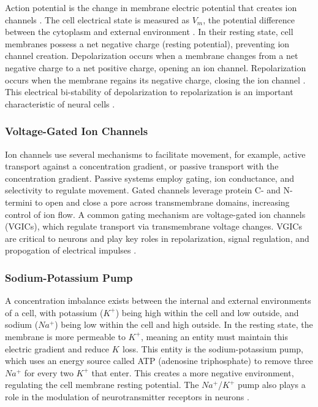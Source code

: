 \documentclass{article} %
\begin{document}
\begin{multicols}{2}
Action potential is the change in membrane electric potential that creates ion channels \cite{rubaiy2017electrophysiology}. The cell electrical state is measured as $V_{m}$, the potential difference between the cytoplasm and external environment \cite{cervera2016bioelectrical}. In their resting state, cell membranes possess a net negative charge (resting potential), preventing ion channel creation. Depolarization occurs when a membrane changes from a net negative charge to a net positive charge, opening an ion channel. Repolarization occurs when the membrane regains its negative charge, closing the ion channel \cite{rubaiy2017electrophysiology}. This electrical bi-stability of depolarization to repolarization is an important characteristic of neural cells \cite{cervera2016bioelectrical}.

\subsubsection{Voltage-Gated Ion Channels}
\label{subsubsec:vgic}

Ion channels use several mechanisms to facilitate movement, for example, active transport against a concentration gradient, or passive transport with the concentration gradient. Passive systems employ gating, ion conductance, and selectivity to regulate movement. Gated channels leverage protein C- and N-termini to open and close a pore across transmembrane domains, increasing control of ion flow. A common gating mechanism are voltage-gated ion channels (VGICs), which regulate transport via transmembrane voltage changes. VGICs are critical to neurons and play key roles in repolarization, signal regulation, and propogation of electrical impulses \cite{rubaiy2017electrophysiology}. 

\subsubsection{Sodium-Potassium Pump}
\label{subsubsec:na_k_pump}

A concentration imbalance exists between the internal and external environments of a cell, with potassium ($K^{+}$) being high within the cell and low outside, and sodium ($Na^{+}$) being low within the cell and high outside. In the resting state, the membrane is more permeable to $K^{+}$, meaning an entity must maintain this electric gradient and reduce $K^{}$ loss. This entity is the sodium-potassium pump, which uses an energy source called ATP (adenosine triphosphate) to remove three $Na^{+}$ for every two $K^{+}$ that enter. This creates a more negative environment, regulating the cell membrane resting potential. The $Na^{+}$/$K^{+}$ pump also plays a role in the modulation of neurotransmitter receptors in neurons \cite{pivovarov2018na/kpump}. 


\end{multicols}
\end{document}
